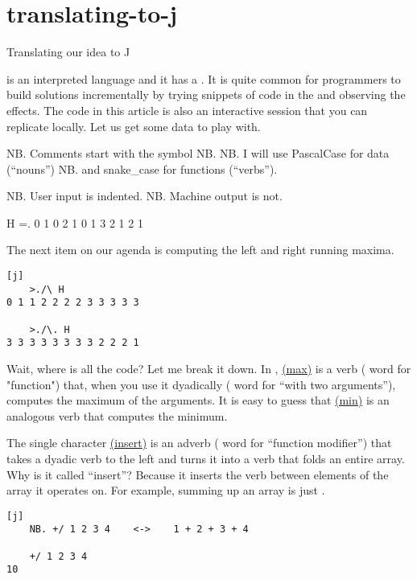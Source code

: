 \documentclass{article}
\begin{document}
\section{translating-to-j}{Translating our idea to J}

 is an interpreted language and it has a \href{https://en.wikipedia.org/wiki/Read%E2%80%93eval%E2%80%93print_loop}{\sc{repl}}.
It is quite common for  programmers to build solutions incrementally by trying snippets of code in the  and observing the effects.
The code in this article is also an interactive  session that you can replicate locally.
Let us get some data to play with.

\begin{code}[j]
    NB. Comments start with the symbol NB.
    NB. I will use PascalCase for data (“nouns”)
    NB. and snake_case for functions (“verbs”).

    NB. User input is indented.
NB. Machine output is not.

    H =. 0 1 0 2 1 0 1 3 2 1 2 1
\end{code}

The next item on our agenda is computing the left and right running maxima.

\begin{verbatim}[j]
    >./\ H
0 1 1 2 2 2 2 3 3 3 3 3

    >./\. H
3 3 3 3 3 3 3 3 2 2 2 1
\end{verbatim}

Wait, where is all the code?
Let me break it down.
In , \href{https://code.jsoftware.com/wiki/Vocabulary/gtdot#dyadic}{ (max)} is a verb ( word for "function") that, when you use it dyadically ( word for ``with two arguments''), computes the maximum of the arguments.
It is easy to guess that \href{https://code.jsoftware.com/wiki/Vocabulary/ltdot#dyadic}{ (min)} is an analogous verb that computes the minimum.

The single character \href{https://code.jsoftware.com/wiki/Vocabulary/slash}{\code{/} (insert)} is an adverb ( word for ``function modifier'') that takes a dyadic verb to the left and turns it into a verb that folds an entire array.
Why is it called ``insert''?
Because it inserts the verb between elements of the array it operates on.
For example, summing up an array is just \code{+/}.

\begin{verbatim}[j]
    NB. +/ 1 2 3 4    <->    1 + 2 + 3 + 4

    +/ 1 2 3 4
10
\end{verbatim}
\end{document}
